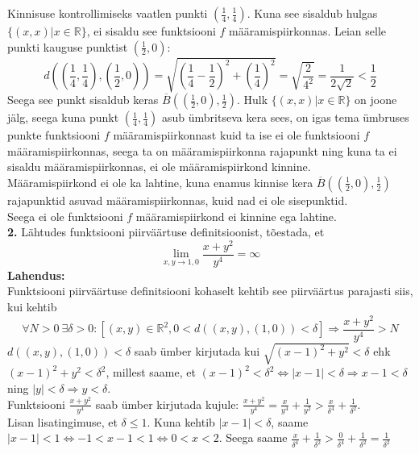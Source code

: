\documentclass{article}
\begin{document}
Kinnisuse kontrollimiseks vaatlen punkti $\left(\frac{1}{4},\frac{1}{4}\right)$. Kuna see sisaldub hulgas $\{(x,x)|x\in\mathbb{R}\}$, ei sisaldu see funktsiooni $f$ määramispiirkonnas. Leian selle punkti kauguse punktist $\left(\frac{1}{2},0\right)$:
\begin{equation*}
d\left(\left(\frac{1}{4},\frac{1}{4}\right),\left(\frac{1}{2},0\right)\right)=\sqrt{\left(\frac{1}{4}-\frac{1}{2}\right)^2+\left(\frac{1}{4}\right)^2}=\sqrt{\frac{2}{4^2}}=\frac{1}{2\sqrt{2}}<\frac{1}{2}
\end{equation*}
Seega see punkt sisaldub keras $\overline{B}\left(\left(\frac{1}{2},0\right),\frac{1}{2}\right)$. Hulk $\{(x,x)|x\in\mathbb{R}\}$ on joone jälg, seega kuna punkt $\left(\frac{1}{4},\frac{1}{4}\right)$ asub ümbritseva kera sees, on igas tema ümbruses punkte funktsiooni $f$ määramispiirkonnast kuid ta ise ei ole funktsiooni $f$ määramispiirkonnas, seega ta on määramispiirkonna rajapunkt ning kuna ta ei sisaldu määramispiirkonnas, ei ole määramispiirkond kinnine.\\
Määramispiirkond ei ole ka lahtine, kuna enamus kinnise kera $\overline{B}\left(\left(\frac{1}{2},0\right),\frac{1}{2}\right)$ rajapunktid asuvad määramispiirkonnas, kuid nad ei ole sisepunktid.\\
Seega ei ole funktsiooni $f$ määramispiirkond ei kinnine ega lahtine.\pagebreak\\
\textbf{2. }Lähtudes funktsiooni piirväärtuse definitsioonist, tõestada, et
\begin{equation*}
\lim_{x,y\to1,0}\frac{x+y^2}{y^4}=\infty
\end{equation*}
\textbf{Lahendus:}\\
Funktsiooni piirväärtuse definitsiooni kohaselt kehtib see piirväärtus parajasti siis, kui kehtib
\begin{equation*}
\forall N>0\ \exists\delta>0:[(x,y)\in\mathbb{R}^2,0<d((x,y),(1,0))<\delta]\Rightarrow\frac{x+y^2}{y^4}>N
\end{equation*}
$d((x,y),(1,0))<\delta$ saab ümber kirjutada kui $\sqrt{(x-1)^2+y^2}<\delta$ ehk $(x-1)^2+y^2<\delta^2$, millest saame, et $(x-1)^2<\delta^2\Leftrightarrow |x-1|<\delta\Rightarrow x-1<\delta$ ning $|y|<\delta\Rightarrow y<\delta$.\\
Funktsiooni $\frac{x+y^2}{y^4}$ saab ümber kirjutada kujule: $\frac{x+y^2}{y^4}=\frac{x}{y^4}+\frac{1}{y^2}>\frac{x}{\delta^4}+\frac{1}{\delta^2}$.\\
Lisan lisatingimuse, et $\delta\leq1$. Kuna kehtib $|x-1|<\delta$, saame $|x-1|<1\Leftrightarrow -1<x-1<1\Leftrightarrow 0<x<2$. Seega saame $\frac{x}{\delta^4}+\frac{1}{\delta^2}>\frac{0}{\delta^4}+\frac{1}{\delta^2}=\frac{1}{\delta^2}$\\
\end{document}
